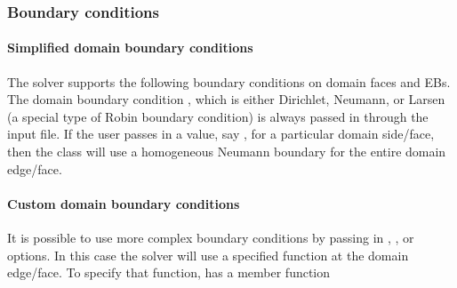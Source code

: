 \documentclass[letterpaper,10pt,english]{sphinxmanual}
\begin{document}
\subsubsection{Boundary conditions}
\label{\detokenize{Solvers/RTE:boundary-conditions}}\label{\detokenize{Solvers/RTE:chap-eddingtonsp1bc}}

\paragraph{Simplified domain boundary conditions}
\label{\detokenize{Solvers/RTE:simplified-domain-boundary-conditions}}
\sphinxAtStartPar
The  solver supports the following boundary conditions on domain faces and EBs.
The domain boundary condition , which is either Dirichlet, Neumann, or Larsen (a special type of Robin boundary condition) is always passed in through the input file.
If the user passes in a value, say , for a particular domain side/face, then the class will use a homogeneous Neumann boundary for the entire domain edge/face.


\paragraph{Custom domain boundary conditions}
\label{\detokenize{Solvers/RTE:custom-domain-boundary-conditions}}
\sphinxAtStartPar
It is possible to use more complex boundary conditions by passing in , , or  options.
In this case the  solver will use a specified function at the domain edge/face.
To specify that function,  has a member function

\begin{sphinxVerbatim}[commandchars=\\\{\},formatcom=\scriptsize]
   
                               
                                    
\end{sphinxVerbatim}
\end{document}
